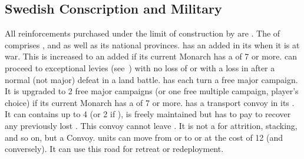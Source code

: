 \subsection{Swedish Conscription and Military}
\label{chSpecific:Sweden:Conscription}
\aparag All reinforcements purchased under the limit of construction by
\SUE are .
\aparag The  of \SUE comprises
,  and  as well as
its national provinces.
\aparag \SUE has an added \ARMY\facemoins in its 
when it is at war. This is increased to an added \ARMY\faceplus if its
current Monarch has a \MIL of 7 or more.
\aparag \SUE can proceed to exceptional levies
(see~) with no loss of \STAB or
with a loss in \STAB after a normal (not major) defeat in a land battle.
\aparag \SUE has each turn a free major campaign. It is upgraded to 
2 free major campaigns (or one free multiple campaign, player's choice) 
if its current Monarch has a \MIL of 7 or more.
 \SUE has a transport convoy in its
. It can contains up to 4 \NTD (or 2 \NTD if
\facemoins), is freely maintained but \SUE has to pay to recover any
previously lost \NTD. This convoy cannot leave . It is
not a \FLEET for attrition, stacking, and so on, but a Convoy.
 \SUE units can move from
 or  to  or
 at the cost of 12 \MP (and conversely).  It can
use this road for retreat or redeployment.

